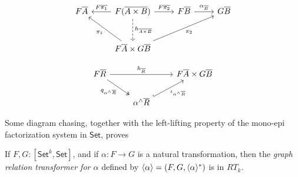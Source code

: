 \documentclass[runningheads]{llncs}
\newcommand{\set}{\mathsf{Set}}
\begin{document}
\begin{figure*}[ht]
\vspace*{-0.3in}
  \begin{minipage}[b]{0.25\linewidth}
{\footnotesize\[\begin{tikzcd}[row sep = large]
        F\overline{A}
        &F(\overline{A \times B})
        \ar[l, "{F\overline{\pi_1}}"']
        \ar[r, "{F\overline{\pi_2}}"]
        \ar[d, dashed, "{h_{\overline{A \times B}}}"]
        &F\overline{B}
        \ar[r, "{\alpha_{\ol{B}}}"]
        &G\overline{B} \\
        &F\overline{A} \times G\overline{B}
        \ar[ul, "{\pi_1}"] \ar[urr, "{\pi_2}"']
\end{tikzcd}\]}
  \end{minipage}
  \hspace*{1.4in}
  \begin{minipage}[b]{0.5\linewidth}
{\footnotesize\[\begin{tikzcd}
        F\overline{R}
        \ar[rr, "{h_{\overline{R}}}"]
        \ar[dr, twoheadrightarrow, "{q_{\alpha^\wedge\overline{R}}}"']
        &&F\overline{A} \times G\overline{B} \\
        &\alpha^\wedge\overline{R}
        \ar[ur, hookrightarrow, "{\iota_{\alpha^\wedge\overline{R}}}"']
\end{tikzcd}\]}
\end{minipage}\vspace*{-0.3in}
\end{figure*}


Some diagram chasing, together with the left-lifting property of the
mono-epi factorization system in $\set$, proves
\begin{lemma}\label{lem:graph-reln-functors}
If $F,G : [\set^k,\set]$, and if $\alpha : F \to G$ is a natural
transformation, then the {\em graph relation transformer for $\alpha$}
defined by $\langle {\alpha} \rangle = (F, G, \langle {\alpha} \rangle^*)$ is in $RT_k$.
\end{lemma}
\end{document}
